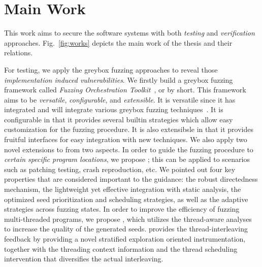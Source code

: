 \section{Main Work}

This work aims to secure the software systems with both \emph{testing} and \emph{verification} approaches. Fig.~\ref{fig:works} depicts the main work of the thesis and their relations.

For testing, we apply the greybox fuzzing approaches to reveal those \emph{implementation induced vulnerabilities}. We firstly build a greybox fuzzing framework called \emph{Fuzzing Orchestration Toolkit}~\cite{fse18-fot}, or \FOT by short. This framework aims to be \emph{versatile}, \emph{configurable}, and \emph{extensible}. It is versatile since it has integrated and will integrate various greybox fuzzing techniques~\cite{Bohme:2016:CGF,Bohme:2017:DGF,redqueen,CollAFL,Angora,fuzz_survey}. It is configurable in that it provides several builtin strategies which allow easy customization for the fuzzing procedure. It is also extensibsle in that it provides fruitful interfaces for easy integration with new techniques. We also apply two novel extensions to \FOT from two aspects. In order to guide the fuzzing procedure to \emph{certain specific program locations}, we propose \dFOT; this can be applied to scenarios such as patching testing, crash reproduction, etc. We pointed out four key properties that are considered important to the guidance: the robust directedness mechanism, the lightweight yet effective integration with static analysis, the optimized seed prioritization and scheduling strategies, as well as the adaptive strategies across fuzzing states. In order to improve the efficiency of fuzzing multi-threaded programs, we propose \mtfuzz, which utilizes the thread-aware analyses to increase the quality of the generated seeds. \mtfuzz provides the thread-interleaving feedback by providing a novel stratified exploration oriented instrumentation, together with the threading context information and the thread scheduling intervention that diversifies the actual interleaving.


